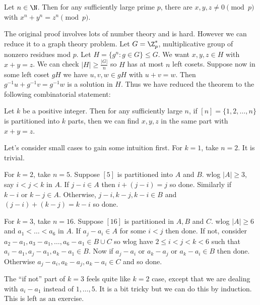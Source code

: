 \documentclass[a4paper]{article}
\begin{document}
\begin{enumerate}
  \begin{theorem}
    Let \(n \in \N\). Then for any sufficiently large prime \(p\), there are \(x, y, z \neq 0 \pmod p\) with \(x^n + y^n = z^n \pmod p\).
  \end{theorem}

  The original proof involves lots of number theory and is hard. However we can reduce it to a graph theory problem. Let \(G = \Z_p^*\), multiplicative group of nonzero residues mod \(p\). Let \(H = \{g^n: g \in G\} \leq G\). We want \(x, y, z \in H\) with \(x + y = z\). We can check \(|H| \geq \frac{|G|}{n}\) so \(H\) has at most \(n\) left cosets. Suppose now in some left coset \(gH\) we have \(u, v, w \in gH\) with \(u + v = w\). Then \(g^{-1}u + g^{-1}v = g^{-1}w\) is a solution in \(H\). Thus we have reduced the theorem to the following combinatorial statement:

  \begin{theorem}[Schur]
    Let \(k\) be a positive integer. Then for any sufficiently large \(n\), if \([n] = \{1, 2, \dots, n\}\) is partitioned into \(k\) parts, then we can find \(x, y, z\) in the same part with \(x + y = z\).
  \end{theorem}
\end{enumerate}

Let's consider small cases to gain some intuition first. For \(k = 1\), take \(n = 2\). It is trivial.

For \(k = 2\), take \(n = 5\). Suppose \([5]\) is partitioned into \(A\) and \(B\). wlog \(|A| \geq 3\), say \(i < j < k\) in \(A\). If \(j - i \in A\) then \(i + (j - i) = j\) so done. Similarly if \(k - i \text{ or } k - j \in A\). Otherwise, \(j - i, k - j, k - i \in B\) and \((j - i) + (k - j) = k - i\) so done.

For \(k = 3\), take \(n = 16\). Suppose \([16]\) is partitioned in \(A, B\) and \(C\). wlog \(|A| \geq 6\) and \(a_1 < \dots < a_6\) in \(A\). If \(a_j - a_i \in A\) for some \(i < j\) then done. If not, consider \(a_2 - a_1, a_3 - a_1, \dots, a_6 - a_1 \in B \cup C\) so wlog have \(2 \leq i < j < k < 6\) such that \(a_i - a_1, a_j - a_1, a_k - a_1 \in B\). Now if \(a_j - a_i \text{ or } a_k - a_j \text{ or } a_k - a_i \in B\) then done. Otherwise \(a_j - a_i, a_k - a_j, a_k - a_i \in C\) and so done.

The ``if not'' part of \(k = 3\) feels quite like \(k = 2\) case, except that we are dealing with \(a_i - a_1\) instead of \(1, \dots, 5\). It is a bit tricky but we can do this by induction. This is left as an exercise.
\end{document}
